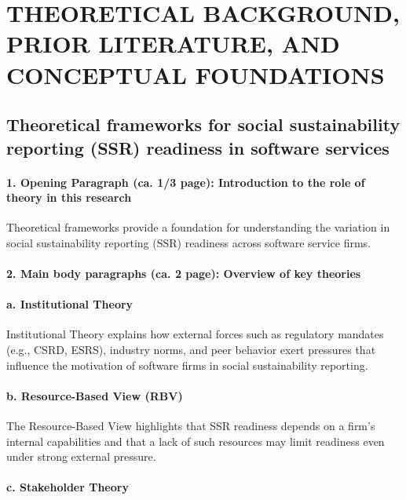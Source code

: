 \chapter{THEORETICAL BACKGROUND, PRIOR LITERATURE, AND CONCEPTUAL FOUNDATIONS}

\section{Theoretical frameworks for social sustainability reporting (SSR) readiness in software services}

\subsubsection{1. Opening Paragraph (ca. 1/3 page): Introduction to the role of theory in this research}

Theoretical frameworks provide a foundation for understanding the variation 
in social sustainability reporting (SSR) readiness across software service firms.

\subsubsection{2. Main body paragraphs (ca. 2 page): Overview of key theories}

\vspace{8pt}
\subsubsection{a. Institutional Theory}

Institutional Theory \parencite{DiMaggio1983} explains how external forces such as regulatory mandates (e.g., CSRD, ESRS),
industry norms, and peer behavior exert pressures that influence the motivation of software firms in 
social sustainability reporting.

\subsubsection{b. Resource-Based View (RBV)}

The Resource-Based View \parencite{Barney1991} highlights that SSR readiness depends on a firm's internal capabilities 
and that a lack of such resources may limit readiness even under strong external pressure.

\subsubsection{c. Stakeholder Theory}

